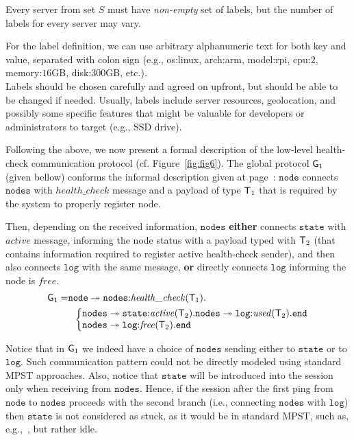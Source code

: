 \begin{definition}
	Every server from set $S$ must have \emph{non-empty} set of labels, but the number of labels for every server may vary.
\end{definition}

\noindent
For the label definition, we can use arbitrary alphanumeric text for both key and value, separated with colon sign (e.g.,  os:linux, arch:arm, model:rpi, cpu:$2$, memory:$16$GB, disk:$300$GB, etc.).\\

Labels should be chosen carefully and agreed on upfront, but should be able to be changed if needed. Usually, labels include server resources, geolocation, and possibly some specific features that might be valuable for developers or administrators to target (e.g., SSD drive).

Following the above, we now present a formal description of the low-level health-check communication protocol (cf. Figure~\ref{fig:fig6}). 
The global protocol ${\sf G}_1$ (given bellow) conforms the informal description given at 
page~\pageref{informal_description_health-check}: $\mathtt{node}$ connects $\mathtt{nodes}$ with $\mathit{health{\_}check}$ message and a payload of type ${\mathsf T}_1$ that is required by the system to properly register node. 

Then, depending on the received information, $\mathtt{nodes}$ {\bf either} connects $\mathtt{state}$ with $\mathit{active}$ 
message, informing the node status with a payload typed with ${\mathsf T}_2$ (that contains information required to register active health-check sender),
and then also connects $\mathtt{log}$ with the same message, 
{\bf or} directly connects $\mathtt{log}$ informing the node is $\mathit{free}$.
\begin{align*}
\G_1 = & 
\mathtt{node} \twoheadrightarrow \mathtt{nodes}{:}\mathit{health{\_}check}(\T_1).\\
& \hspace{2mm}
\left\{
\begin{array}{@{}l@{}}
\mathtt{nodes} \twoheadrightarrow \mathtt{state}{:}\mathit{active}(\T_2).\mathtt{nodes}\twoheadrightarrow \mathtt{log}{:}\mathit{used}(\T_2).\tend\\
\mathtt{nodes}\twoheadrightarrow \mathtt{log}{:}\mathit{free}(\T_2).\tend
\end{array} \right.
\end{align*}

Notice that in ${\sf G}_1$ we indeed have a choice of $\mathtt{nodes}$ sending either to $\mathtt{state}$ or to $\mathtt{log}$. Such communication pattern could not be directly modeled using standard MPST approaches. 
Also, notice that $\mathtt{state}$ will be introduced into the session only when receiving from $\mathtt{nodes}$. 
Hence, if the session after the first ping from $\mathtt{node}$ to $\mathtt{nodes}$ proceeds with the second branch (i.e., connecting $\mathtt{nodes}$ with $\mathtt{log}$) then $\mathtt{state}$ is not considered as stuck, as it would be in standard MPST, such as, e.g.,~\cite{HondaYC08}, but rather idle. 


